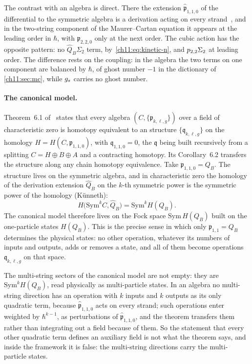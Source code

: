 The contrast with an \IBL{} algebra is direct.
There the extension $\hat{\mathfrak{p}}_{1, 1, 0}$ of the differential to the symmetric algebra is a derivation acting on every strand~\cite{Cieliebak:2015:HomologicalAlgebraRelated}, and in the two-string component of the Maurer--Cartan equation it appears at the leading order in $\hbar$, with $\mathfrak{p}_{2, 2, 0}$ only at the next order.
The cubic action has the opposite pattern: no $\hat{Q}_B \Sigma_2$ term, by~\eqref{ch11:eq:kinetic-n}, and $p_{2,2} \Sigma_2$ at leading order.
The difference rests on the coupling: in the \IBL{} algebra the two terms on one component are balanced by $\hbar$, of ghost number $-1$ in the dictionary of \cref{ch11:sec:mc}, while $g_s$ carries no ghost number.

\paragraph{The canonical model.}

Theorem~6.1 of~\cite{Cieliebak:2015:HomologicalAlgebraRelated} states that every \IBL{} algebra $(C, \{\mathfrak{p}_{k, \ell, g}\})$ over a field of characteristic zero is homotopy equivalent to an \IBL{} structure $\{\mathfrak{q}_{k, \ell, g}\}$ on the homology $H = H(C, \mathfrak{p}_{1, 1, 0})$, with $\mathfrak{q}_{1, 1, 0} = 0$, the $\mathfrak{q}$ being built recursively from a splitting $C = H \oplus B \oplus A$ and a contracting homotopy.
Its Corollary~6.2 transfers the structure along any chain homotopy equivalence.
Take $\mathfrak{p}_{1, 1, 0} = Q_B$.
The structure lives on the symmetric algebra, and in characteristic zero the homology of the derivation extension $\hat{Q}_B$ on the $k$-th symmetric power is the symmetric power of the homology (Künneth):
\begin{equation}
  \label{ch11:eq:kunneth}
  H \bigl( \mathrm{Sym}^k C, \hat{Q}_B \bigr)
    = \mathrm{Sym}^k H(Q_B).
\end{equation}
The canonical model therefore lives on the Fock space $\mathrm{Sym} \, H(Q_B)$ built on the one-particle states $H(Q_B)$.
This is the precise sense in which only $\mathfrak{p}_{1, 1} = Q_B$ determines the physical states: no other operation, whatever its numbers of inputs and outputs, adds or removes a state, and all of them become operations $\mathfrak{q}_{k, \ell, g}$ on that space.

The multi-string sectors of the canonical model are not empty: they are $\mathrm{Sym}^k H(Q_B)$, read physically as multi-particle states.
In an \IBL{} algebra no multi-string direction has an operation with $k$ inputs and $k$ outputs as its only quadratic term, because $\hat{\mathfrak{p}}_{1, 1, 0}$ acts on every strand; such operations enter weighted by $\hbar^{k - 1}$, as perturbations of $\hat{\mathfrak{p}}_{1, 1, 0}$, and the theorem transfers them rather than integrating out a field because of them.
So the statement that every other quadratic term defines an auxiliary field is not what the theorem says, and inside the \IBL{} framework it is false: the multi-string directions carry the multi-particle states.

